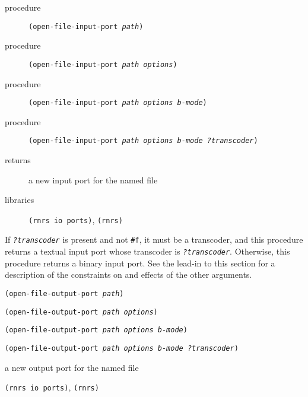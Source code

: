\begin{description}

\label{io_s29}\item[procedure] \texttt{(open-file-input-port \textit{path})}



\item[procedure] \texttt{(open-file-input-port \textit{path} \textit{options})}



\item[procedure] \texttt{(open-file-input-port \textit{path} \textit{options} \textit{b-mode})}



\item[procedure] \texttt{(open-file-input-port \textit{path} \textit{options} \textit{b-mode} \textit{?transcoder})}



\item[returns] a new input port for the named file


\item[libraries] \texttt{(rnrs io ports)}, \texttt{(rnrs)}
\end{description}


If \texttt{\textit{?transcoder}} is present and not \texttt{\#{}f}, it must be a
transcoder, and this procedure returns a textual input port
whose transcoder is \texttt{\textit{?transcoder}}.
Otherwise, this procedure returns a binary input port.
See the lead-in to this section for a description of the constraints
on and effects of the other arguments.


\begin{description}

\label{io_s30}\item[procedure] \texttt{(open-file-output-port \textit{path})}



\item[procedure] \texttt{(open-file-output-port \textit{path} \textit{options})}



\item[procedure] \texttt{(open-file-output-port \textit{path} \textit{options} \textit{b-mode})}



\item[procedure] \texttt{(open-file-output-port \textit{path} \textit{options} \textit{b-mode} \textit{?transcoder})}



\item[returns] a new output port for the named file


\item[libraries] \texttt{(rnrs io ports)}, \texttt{(rnrs)}
\end{description}


